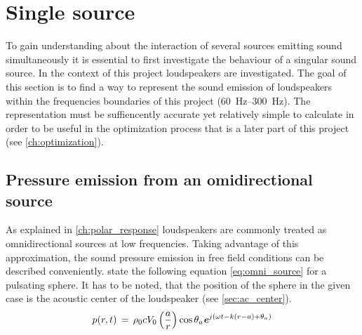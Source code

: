 \section{Single source}\label{ch:single_speaker_source}
To gain understanding about the interaction of several sources emitting sound simultaneously it is essential to first investigate the behaviour of a singular sound source. In the context of this project loudspeakers are investigated. The goal of this section is to find a way to represent the sound emission of loudspeakers within the frequencies boundaries of this project (\SIrange{60}{300}{\hertz}).
The representation must be suffiencently accurate yet relatively simple to calculate in order to be useful in the optimization process that is a later part of this project (see \autoref{ch:optimization}).

\subsection{Pressure emission from an omidirectional source}
As explained in \autoref{ch:polar_response} loudspeakers are commonly treated as omnidirectional sources at low frequencies. Taking advantage of this approximation, the sound pressure emission in free field conditions can be described conveniently. \citep[p. 171]{Kinsler2000} state the following equation \autoref{eq:omni_source} for a pulsating sphere. It has to be noted, that the position of the sphere in the given case is the acoustic center of the loudspeaker (see \autoref{sec:ac_center}).
\begin{equation}\label{eq:omni_source}
p(r,t)\,=\,\rho_0 c V_0 \left(\frac{a}{r}\right)\cos \theta_a \textbf{\textit{e}}^{j\left(\omega t - k(r-a)+\theta_a\right)}
\end{equation}
\startexplain
{}
\stopexplain

